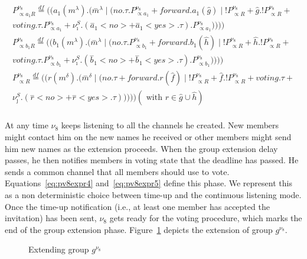 \begin{equation}
	\label{eq:pv8expr6}
	\begin{gathered}
		P^{\nu_8}_{\propto a_1R}\overset{df}{=}((a_1(m^\lambda).(\overset{-}{m}^\lambda\mid (no.\tau.P^{\nu_8}_{\propto a_1} + forward.a_1(\hat{g})\mid !P^{\nu_8}_{\propto R} + \hat{g}.!P^{\nu_8}_{\propto R} +\\ voting.\tau.P^{\nu_8}_{\propto a_1} + \nu_\imath^S.(\overset{-}{a}_1<no> + \overset{-}{a}_1<yes>.\tau).P^{\nu_8}_{\propto a_1}))))\\
		P^{\nu_8}_{\propto b_1R}\overset{df}{=}((b_1(m^\lambda).(\overset{-}{m}^\lambda\mid (no.\tau.P^{\nu_8}_{\propto b_1} + forward.b_1(\hat{h})\mid !P^{\nu_8}_{\propto R} + \hat{h}.!P^{\nu_8}_{\propto R} +\\ voting.\tau.P^{\nu_8}_{\propto b_1} + \nu_\imath^S.(\overset{-}{b}_1<no> + \overset{-}{b}_1<yes>.\tau).P^{\nu_8}_{\propto b_1}))))\\
		P^{\nu_8}_{\propto R}\overset{df}{=}((r(m^\delta).(\overset{-}{m}^\delta\mid (no.\tau + forward.r(\hat{f})\mid !P^{\nu_8}_{\propto R} + \hat{f}.!P^{\nu_8}_{\propto R} + voting.\tau +\\ \nu_\jmath^S.(\overset{-}{r}<no> + \overset{-}{r}<yes>.\tau))))) (\mbox{ with } r\in\hat{g}\cup\hat{h})\\
	\end{gathered}
\end{equation}

At any time $\nu_8$ keeps listening to all the channels he created. New members might contact him on the new names he
received or other members might send him new names as the extension proceeds. When the group extension delay passes, he
then notifies members in voting state that the deadline has passed. He sends a common channel that all members should use
to vote. Equations~\ref{eq:pv8expr4} and~\ref{eq:pv8expr5} define this phase. We represent this as a non deterministic
choice between time-up and the continuous listening mode. Once the time-up notification (i.e., at least one member has
accepted the invitation) has been sent, $\nu_8$ gets ready for the voting procedure, which marks the end of the group
extension phase. Figure~\ref{fig:groupformv8} depicts the extension of group $g^{\nu_8}$.

\begin{figure}
	\centering 
	\caption{Extending group $g^{\nu_8}$} 
	\label{fig:groupformv8} 
\end{figure}

